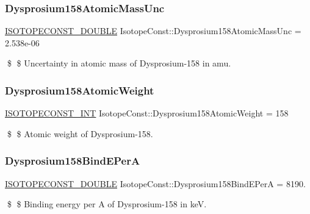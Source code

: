 \subsubsection{\texorpdfstring{Dysprosium158\+Atomic\+Mass\+Unc}{Dysprosium158AtomicMassUnc}}
{\footnotesize\ttfamily \mbox{\hyperlink{group___isotope_const-_macros_ga8f45a7272ce02c0b4c65c44636ed719a}{I\+S\+O\+T\+O\+P\+E\+C\+O\+N\+S\+T\+\_\+\+D\+O\+U\+B\+LE}} Isotope\+Const\+::\+Dysprosium158\+Atomic\+Mass\+Unc = 2.\+538e-\/06}

\$ \$ Uncertainty in atomic mass of Dysprosium-\/158 in amu. \mbox{\label{group___isotope_const-_dysprosium-_dy158_ga139c3b63a97205da9c3525e2b4d56c00}} 
\subsubsection{\texorpdfstring{Dysprosium158\+Atomic\+Weight}{Dysprosium158AtomicWeight}}
{\footnotesize\ttfamily \mbox{\hyperlink{group___isotope_const-_macros_ga5f18360b3e99483a35c32d789e62621c}{I\+S\+O\+T\+O\+P\+E\+C\+O\+N\+S\+T\+\_\+\+I\+NT}} Isotope\+Const\+::\+Dysprosium158\+Atomic\+Weight = 158}

\$ \$ Atomic weight of Dysprosium-\/158. \mbox{\label{group___isotope_const-_dysprosium-_dy158_gabe383be08909917bc78b937ee0fc4185}} 
\subsubsection{\texorpdfstring{Dysprosium158\+Bind\+E\+PerA}{Dysprosium158BindEPerA}}
{\footnotesize\ttfamily \mbox{\hyperlink{group___isotope_const-_macros_ga8f45a7272ce02c0b4c65c44636ed719a}{I\+S\+O\+T\+O\+P\+E\+C\+O\+N\+S\+T\+\_\+\+D\+O\+U\+B\+LE}} Isotope\+Const\+::\+Dysprosium158\+Bind\+E\+PerA = 8190.}

\$ \$ Binding energy per A of Dysprosium-\/158 in keV. \mbox{\label{group___isotope_const-_dysprosium-_dy158_gafb9c678108774156349e076b46a4d6e8}} 
